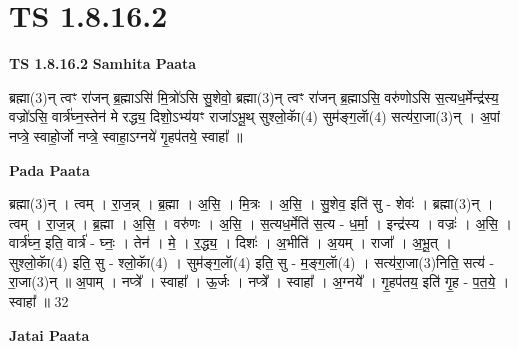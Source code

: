 \documentclass[17pt]{extarticle}
\begin{document}
\section{ TS 1.8.16.2 }

\textbf{TS 1.8.16.2 } \newline
\textbf{Samhita Paata} \newline

ब्रह्मा(3)न् त्वꣳ रा॑जन् ब्र॒ह्माऽसि॑ मि॒त्रो॑ऽसि सु॒शेवो॒ ब्रह्मा(3)न् त्वꣳ रा॑जन् ब्र॒ह्माऽसि॒ वरु॑णोऽसि स॒त्यध॒र्मेन्द्र॑स्य॒ वज्रो॑ऽसि॒ वार्त्र॑घ्न॒स्तेन॑ मे रद्ध्य॒ दिशो॒ऽभ्य॑यꣳ राजा॑ऽभू॒थ् सुश्लो॒काॅ(4) सुम॑ङ्ग॒लाॅ(4) सत्य॑रा॒जा(3)न् । अ॒पां नप्त्रे॒ स्वाहो॒र्जो नप्त्रे॒ स्वाहा॒ऽग्नये॑ गृ॒हप॑तये॒ स्वाहा᳚ ॥ \newline

\textbf{Pada Paata} \newline

ब्रह्मा(3)न् । त्वम् । रा॒ज॒न्न् । ब्र॒ह्मा । अ॒सि॒ । मि॒त्रः । अ॒सि॒ । सु॒शेव॒ इति॑ सु - शेवः॑ । ब्रह्मा(3)न् । त्वम् । रा॒ज॒न्न् । ब्र॒ह्मा । अ॒सि॒ । वरु॑णः । अ॒सि॒ । स॒त्यध॒र्मेति॑ स॒त्य - ध॒र्मा॒ । इन्द्र॑स्य । वज्रः॑ । अ॒सि॒ । वार्त्र॑घ्न॒ इति॒ वार्त्र॑ - घ्नः॒ । तेन॑ । मे॒ । र॒द्ध्य॒ । दिशः॑ । अ॒भीति॑ । अ॒यम् । राजा᳚ । अ॒भू॒त् । सुश्लो॒काॅ(4) इति॒ सु - श्लो॒काॅ(4) । सुम॑ङ्ग॒लाॅ(4) इति॒ सु - म॒ङ्ग॒लाॅ(4) । सत्य॑रा॒जा(3)निति॒ सत्य॑ - रा॒जा(3)न् ॥ अ॒पाम् । नप्त्रे᳚ । स्वाहा᳚ । ऊ॒र्जः । नप्त्रे᳚ । स्वाहा᳚ । अ॒ग्नये᳚ । गृ॒हप॑तय॒ इति॑ गृ॒ह - प॒त॒ये॒ । स्वाहा᳚ ॥ 32  \newline



\textbf{Jatai Paata} \newline
\end{document}
